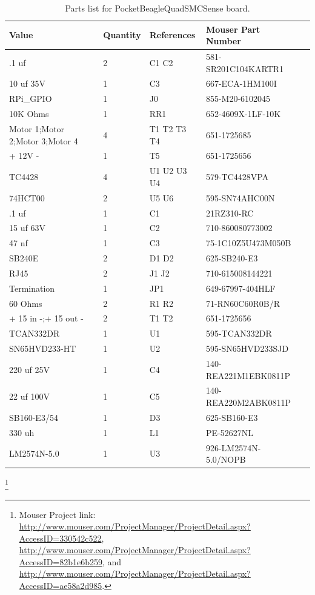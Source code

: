 \begin{table}[htp]
\begin{centering}\begin{tabular}{|l|l|p{1in}|l|p{.5in}|}
\hline
Value&Quantity&References&Mouser Part Number \\
\hline
.1 uf&2&C1 C2&581-SR201C104KARTR1 \\
\hline
10 uf 35V&1&C3&667-ECA-1HM100I \\
\hline
RPi\_GPIO&1&J0&855-M20-6102045 \\
\hline
10K Ohms&1&RR1&652-4609X-1LF-10K \\
\hline
Motor 1;Motor 2;Motor 3;Motor 4&4&T1 T2 T3 T4&651-1725685 \\
\hline
+ 12V -&1&T5&651-1725656 \\
\hline
TC4428&4&U1 U2 U3 U4&579-TC4428VPA \\
\hline
74HCT00&2&U5 U6&595-SN74AHC00N \\
\hline
.1 uf&1&C1&21RZ310-RC\\
\hline
15 uf 63V&1&C2&710-860080773002\\
\hline
47 nf&1&C3&75-1C10Z5U473M050B\\
\hline
SB240E&2&D1 D2&625-SB240-E3\\
\hline
RJ45&2&J1 J2&710-615008144221\\
\hline
Termination&1&JP1&649-67997-404HLF\\
\hline
60 Ohms&2&R1 R2&71-RN60C60R0B/R\\
\hline
+ 15 in -;+ 15 out -&2&T1 T2&651-1725656\\
\hline
TCAN332DR&1&U1&595-TCAN332DR\\
\hline
SN65HVD233-HT&1&U2&595-SN65HVD233SJD\\
\hline
220 uf 25V&1&C4&140-REA221M1EBK0811P\\
\hline
22 uf 100V&1&C5&140-REA220M2ABK0811P\\
\hline
SB160-E3/54&1&D3&625-SB160-E3\\
\hline
330 uh&1&L1&PE-52627NL\\
\hline
LM2574N-5.0&1&U3&926-LM2574N-5.0/NOPB\\
\hline
\end{tabular}
\caption{Parts list for PocketBeagleQuadSMCSense board.}
\end{centering}\end{table}\footnote{Mouser Project link: 
\url{http://www.mouser.com/ProjectManager/ProjectDetail.aspx?AccessID=330542c522},
\url{http://www.mouser.com/ProjectManager/ProjectDetail.aspx?AccessID=82b1e6b259}, and
\url{http://www.mouser.com/ProjectManager/ProjectDetail.aspx?AccessID=ae58a2d985}.}


